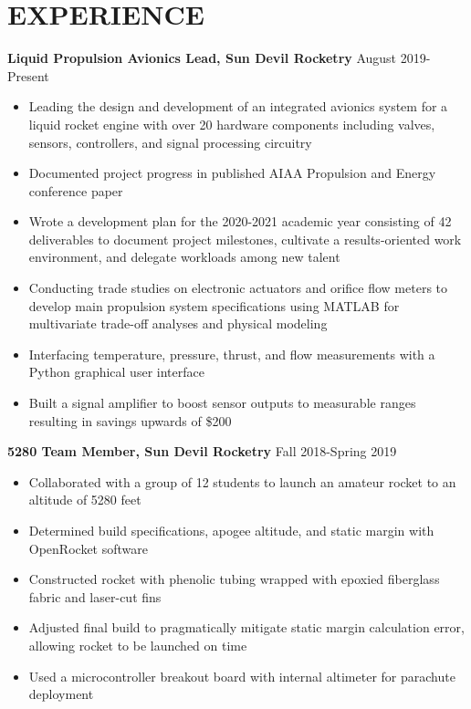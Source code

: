 \documentclass{article}
\begin{document}
\section{EXPERIENCE}
\textbf{Liquid Propulsion Avionics Lead, Sun Devil Rocketry}
\hfill
\vspace{0.5em}
August 2019-Present
\begin{itemize}
	\item{Leading the design and development of an integrated avionics system for a liquid rocket engine with over 20 hardware components including valves, sensors, controllers, and signal processing circuitry}
	\item{Documented project progress in published AIAA Propulsion and Energy conference paper}
	\item{Wrote a development plan for the 2020-2021 academic year consisting of 42 deliverables to document project milestones, cultivate a results-oriented work environment, and delegate workloads among new talent}
	\item{Conducting trade studies on electronic actuators and orifice flow meters to develop main propulsion system specifications using MATLAB for multivariate trade-off analyses and physical modeling}
	\item{Interfacing temperature, pressure, thrust, and flow measurements with a Python graphical user interface}
	\item{Built a signal amplifier to boost sensor outputs to measurable ranges resulting in savings upwards of \$200}
	
\end{itemize}
\vspace{1em}
\textbf{5280 Team Member, Sun Devil Rocketry}
\hfill Fall 2018-Spring 2019
\vspace{0.5em}
\begin{itemize}
	\item Collaborated with a group of 12 students to launch an amateur rocket to an altitude of 5280 feet
	\item Determined build specifications, apogee altitude, and static margin with OpenRocket software
	\item Constructed rocket with phenolic tubing wrapped with epoxied fiberglass fabric and laser-cut fins 
	\item Adjusted final build to pragmatically mitigate static margin calculation error, allowing rocket to be launched on time
	\item Used a microcontroller breakout board with internal altimeter for parachute deployment
\end{itemize}
\end{document}
